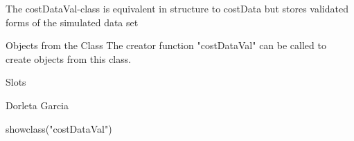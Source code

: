 \begin{Description}\relax
The costDataVal-class is equivalent in structure to costData but stores validated forms of the simulated data set
\end{Description}
\begin{Section}{Objects from the Class}
The creator function "costDataVal" can be called to create objects from this class.
\end{Section}
\begin{Section}{Slots}
\end{Section}
\begin{Author}\relax
Dorleta Garcia 
\end{Author}
\begin{Examples}
\begin{ExampleCode}
showclass("costDataVal")
\end{ExampleCode}
\end{Examples}

